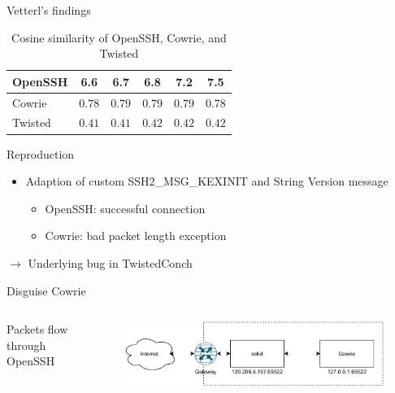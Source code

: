 \begin{frame}{Vetterl's findings}
    \begin{table}
        \caption{Cosine similarity of OpenSSH, Cowrie, and Twisted}
        \begin{tabular}{l|ccccc}
            \toprule
            OpenSSH & 6.6 & 6.7 & 6.8 & 7.2 & 7.5\\
            \hline
            Cowrie & $0.78$ & $0.79$ & $0.79$ & $0.79$ & $0.78$\\
            Twisted & $0.41$ & $0.41$ & $0.42$ & $0.42$ & $0.42$\\
            \bottomrule
        \end{tabular}
    \end{table}

\end{frame}

\begin{frame}{Reproduction}
    \begin{itemize}
        \item Adaption of custom SSH2\_MSG\_KEXINIT and String Version message
        \begin{itemize}
            \item OpenSSH: successful connection
            \item Cowrie: bad packet length exception
        \end{itemize}
    \end{itemize}
    $\rightarrow$ Underlying bug in TwistedConch
\end{frame}

\begin{frame}{Disguise Cowrie}
    \begin{columns}
        \begin{column}{0.3\textwidth}
            Packets flow through OpenSSH
        \end{column}
        \begin{column}{0.7\textwidth}
            \begin{figure}
                \centering
                \includegraphics[width=\columnwidth]{img/sshd-honeypot.pdf}
            \end{figure}
        \end{column}
    \end{columns}
\end{frame}

